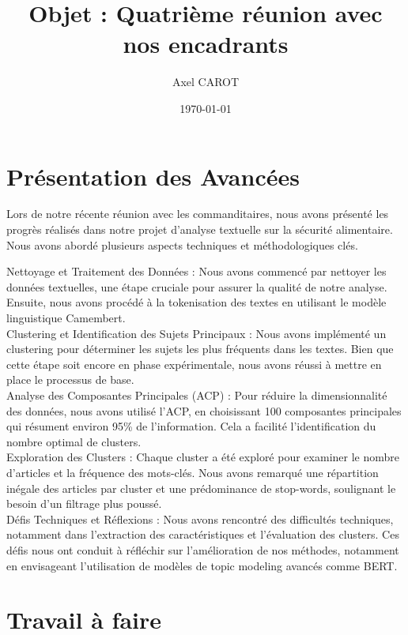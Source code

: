 \documentclass{article}
\title{Objet : Quatrième réunion avec nos encadrants}
\author{Axel CAROT}
\date{\today}
\begin{document}
\maketitle

\section{Présentation des Avancées}

Lors de notre récente réunion avec les commanditaires, nous avons présenté les progrès réalisés dans notre projet d'analyse textuelle sur la sécurité alimentaire. Nous avons abordé plusieurs aspects techniques et méthodologiques clés.

Nettoyage et Traitement des Données : Nous avons commencé par nettoyer les données textuelles, une étape cruciale pour assurer la qualité de notre analyse. Ensuite, nous avons procédé à la tokenisation des textes en utilisant le modèle linguistique Camembert. \\

Clustering et Identification des Sujets Principaux : Nous avons implémenté un clustering pour déterminer les sujets les plus fréquents dans les textes. Bien que cette étape soit encore en phase expérimentale, nous avons réussi à mettre en place le processus de base. \\

Analyse des Composantes Principales (ACP) : Pour réduire la dimensionnalité des données, nous avons utilisé l'ACP, en choisissant 100 composantes principales qui résument environ 95\% de l'information. Cela a facilité l'identification du nombre optimal de clusters.\\

Exploration des Clusters : Chaque cluster a été exploré pour examiner le nombre d'articles et la fréquence des mots-clés. Nous avons remarqué une répartition inégale des articles par cluster et une prédominance de stop-words, soulignant le besoin d'un filtrage plus poussé.\\

Défis Techniques et Réflexions : Nous avons rencontré des difficultés techniques, notamment dans l'extraction des caractéristiques et l'évaluation des clusters. Ces défis nous ont conduit à réfléchir sur l'amélioration de nos méthodes, notamment en envisageant l'utilisation de modèles de topic modeling avancés comme BERT.\\

\section{Travail à faire}
\end{document}
